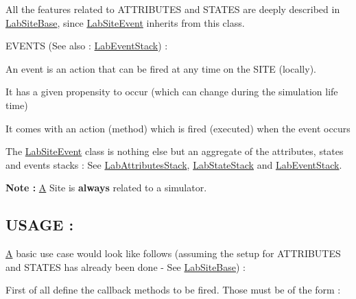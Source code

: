 All the features related to A\+T\+T\+R\+I\+B\+U\+T\+E\+S and S\+T\+A\+T\+E\+S are deeply described in \hyperlink{classelps_1_1_lab_site_base}{Lab\+Site\+Base}, since \hyperlink{classelps_1_1_lab_site_event}{Lab\+Site\+Event} inherits from this class.

E\+V\+E\+N\+T\+S (See also \+: \hyperlink{classelps_1_1_lab_event_stack}{Lab\+Event\+Stack}) \+:

An event is an action that can be fired at any time on the S\+I\+T\+E (locally).


\begin{DoxyItemize}
\item It has a given propensity to occur (which can change during the simulation life time)
\item It comes with an action (method) which is fired (executed) when the event occurs
\end{DoxyItemize}

The \hyperlink{classelps_1_1_lab_site_event}{Lab\+Site\+Event} class is nothing else but an aggregate of the attributes, states and events stacks \+: See \hyperlink{classelps_1_1_lab_attributes_stack}{Lab\+Attributes\+Stack}, \hyperlink{classelps_1_1_lab_state_stack}{Lab\+State\+Stack} and \hyperlink{classelps_1_1_lab_event_stack}{Lab\+Event\+Stack}.

{\bfseries Note \+:} \hyperlink{class_a}{A} Site is {\bfseries always} related to a simulator.

\subsection*{U\+S\+A\+G\+E \+: }

\hyperlink{class_a}{A} basic use case would look like follows (assuming the setup for A\+T\+T\+R\+I\+B\+U\+T\+E\+S and S\+T\+A\+T\+E\+S has already been done -\/ See \hyperlink{classelps_1_1_lab_site_base}{Lab\+Site\+Base}) \+:

First of all define the callback methods to be fired. Those must be of the form \+:


